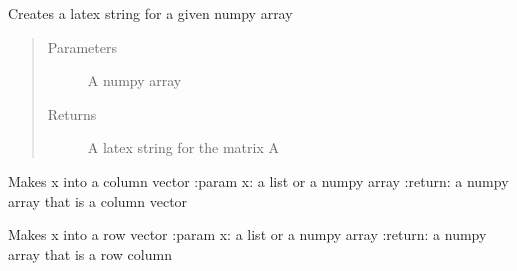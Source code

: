 \documentclass[letterpaper,10pt,english]{sphinxmanual}
\begin{document}
\begin{fulllineitems}
\label{\detokenize{ppopt.utils:ppopt.utils.general_utils.latex_matrix}}
\sphinxAtStartPar
Creates a latex string for a given numpy array
\begin{quote}\begin{description}
\item[{Parameters}] \leavevmode
\sphinxAtStartPar
{} \textendash{} A numpy array

\item[{Returns}] \leavevmode
\sphinxAtStartPar
A latex string for the matrix A

\end{description}\end{quote}

\end{fulllineitems}


\begin{fulllineitems}
\label{\detokenize{ppopt.utils:ppopt.utils.general_utils.make_column}}
\sphinxAtStartPar
Makes x into a column vector
:param x: a list or a numpy array
:return: a numpy array that is a column vector

\end{fulllineitems}


\begin{fulllineitems}
\label{\detokenize{ppopt.utils:ppopt.utils.general_utils.make_row}}
\sphinxAtStartPar
Makes x into a row vector
:param x: a list or a numpy array
:return: a numpy array that is a row column

\end{fulllineitems}
\end{document}
